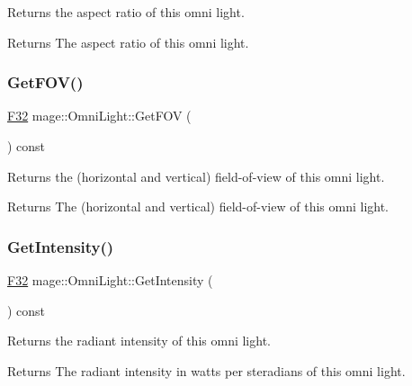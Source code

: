 Returns the aspect ratio of this omni light.

\begin{DoxyReturn}{Returns}
The aspect ratio of this omni light. 
\end{DoxyReturn}
\hypertarget{classmage_1_1_omni_light_a7a0bd82c0272a7eeeb33a9ede796bae1}{}\label{classmage_1_1_omni_light_a7a0bd82c0272a7eeeb33a9ede796bae1} 
\subsubsection{\texorpdfstring{Get\+F\+O\+V()}{GetFOV()}}
{\footnotesize\ttfamily \hyperlink{namespacemage_aa97e833b45f06d60a0a9c4fc22ae02c0}{F32} mage\+::\+Omni\+Light\+::\+Get\+F\+OV (\begin{DoxyParamCaption}{ }\end{DoxyParamCaption}) const\hspace{0.3cm}{\ttfamily [noexcept]}}

Returns the (horizontal and vertical) field-\/of-\/view of this omni light.

\begin{DoxyReturn}{Returns}
The (horizontal and vertical) field-\/of-\/view of this omni light. 
\end{DoxyReturn}
\hypertarget{classmage_1_1_omni_light_ae7309fdbe54b5d6bc6d4e20990ba6bdc}{}\label{classmage_1_1_omni_light_ae7309fdbe54b5d6bc6d4e20990ba6bdc} 
\subsubsection{\texorpdfstring{Get\+Intensity()}{GetIntensity()}}
{\footnotesize\ttfamily \hyperlink{namespacemage_aa97e833b45f06d60a0a9c4fc22ae02c0}{F32} mage\+::\+Omni\+Light\+::\+Get\+Intensity (\begin{DoxyParamCaption}{ }\end{DoxyParamCaption}) const\hspace{0.3cm}{\ttfamily [noexcept]}}

Returns the radiant intensity of this omni light.

\begin{DoxyReturn}{Returns}
The radiant intensity in watts per steradians of this omni light. 
\end{DoxyReturn}
\hypertarget{classmage_1_1_omni_light_a89ce7086bd33e1d419dbd755316daf2e}{}\label{classmage_1_1_omni_light_a89ce7086bd33e1d419dbd755316daf2e} 
